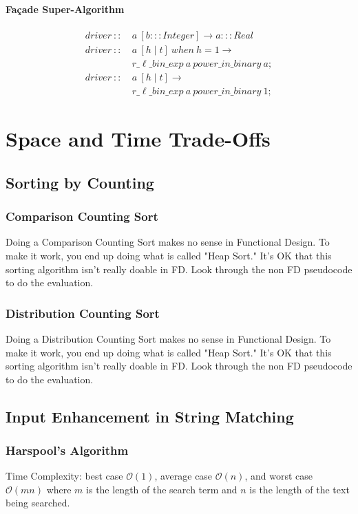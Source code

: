 \documentclass[a4paper,10pt]{book}
\newcommand\when{\  when\ }
\begin{document}
\subsubsection{Fa\c{c}ade Super-Algorithm}
\begin{align*}
driver\ ::\ &a\ [b:::Integer]\rightarrow a:::Real\\
driver\ ::\ &a\ [h\mid t]\when h=1\rightarrow\\
	&r\_\ell\_bin\_exp\ a\ power\_in\_binary\ a;\\
driver\ ::\ &a\ [h\mid t]\rightarrow\\
	&r\_\ell\_bin\_exp\ a\ power\_in\_binary\ 1;
\end{align*}

\chapter{Space and Time Trade-Offs}
\section{Sorting by Counting}
\subsection{Comparison Counting Sort}
Doing a Comparison Counting Sort makes no sense in Functional Design. To make it work, you end up doing what is called "Heap Sort." It's OK that this sorting algorithm isn't really doable in FD. Look through the non FD pseudocode to do the evaluation.
\subsection{Distribution Counting Sort}
Doing a Distribution Counting Sort makes no sense in Functional Design. To make it work, you end up doing what is called "Heap Sort." It's OK that this sorting algorithm isn't really doable in FD. Look through the non FD pseudocode to do the evaluation.

\section{Input Enhancement in String Matching}
\subsection{Harspool's Algorithm}Time Complexity: best case $\mathcal{O}(1)$, average case $\mathcal{O}(n)$, and worst case $\mathcal{O}(mn)$ where $m$ is the length of the search term and $n$ is the length of the text being searched.
\end{document}
